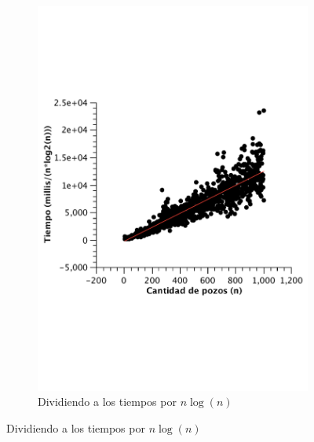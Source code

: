 \begin{figure}[H]
        \begin{subfigure}[b]{0.5\textwidth}
                \includegraphics[width=\textwidth]{imagenes/ej3-nlogn.pdf}
                \caption*{Dividiendo a los tiempos por $n \log(n)$}
        \end{subfigure}

\end{figure}

